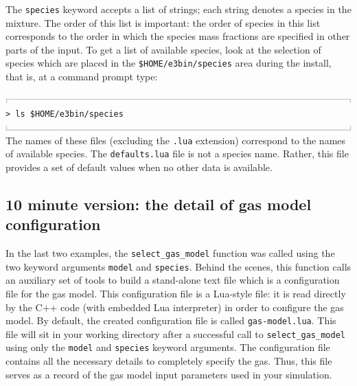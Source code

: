 \documentclass[12pt,a4paper,twoside]{article}
\newcommand{\topbar}{\ensuremath{
    \rule{0.1mm}{2.0mm} \rule[2.0mm]{159.5mm}{0.1mm} \rule{0.1mm}{2.0mm}
}}
\newcommand{\bottombar}{\ensuremath{
    \rule{0.1mm}{2.0mm} \rule{159.5mm}{0.1mm} \rule{0.1mm}{2.0mm}
}}
\begin{document}
\begin{itemize}
\end{itemize}

The \texttt{species} keyword accepts a list of strings; each string denotes
a species in the mixture.  The order of this list is important: the order of
species in this list corresponds to the order in which the species mass fractions
are specified in other parts of the input.
To get a list of available species, look at the selection of species which are placed
in the \texttt{\$HOME/e3bin/species} area during the install, 
that is, at a command prompt type:

\noindent
\topbar\\
\texttt{> ls \$HOME/e3bin/species}\\
\bottombar\\
%
The names of these files (excluding the \texttt{.lua} extension) correspond to the
names of available species.  The \texttt{defaults.lua} file is not a species name.
Rather, this file provides a set of default values when no other data is available.

\subsection{10 minute version: the detail of gas model configuration}
In the last two examples, the \texttt{select\_gas\_model} function was called using
the two keyword arguments \texttt{model} and \texttt{species}.
Behind the scenes, this function calls an auxiliary set of tools to build
a stand-alone text file which is a configuration file for the gas model.
This configuration file is a Lua-style file: it is read directly by the
C++ code (with embedded Lua interpreter) in order to configure the gas model.
By default, the created configuration file is called \texttt{gas-model.lua}.
This file will sit in your working directory after a successful call to
\texttt{select\_gas\_model} using only the \texttt{model} and \texttt{species} keyword
arguments.
The configuration file contains all the necessary details to completely
specify the gas.
Thus, this file serves as a record of the gas model input parameters used in
your simulation.
\end{document}
